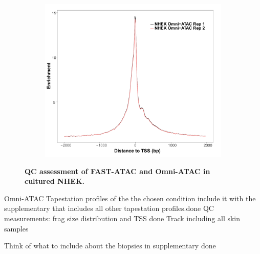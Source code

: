 \begin{figure}[htbp]
\begin{subfigure}{0.48\textwidth}
\end{subfigure}
\begin{subfigure}{0.5\textwidth}
\centering
\includegraphics[width=\textwidth]{./Results1/pdfs/ATAC_skin_TSS_enrichment_NHEK_omni_ATAC}
\caption{\textbf{}} %
\end{subfigure}%
\caption[QC assessment of FAST-ATAC and Omni-ATAC in cultured NHEK]{\textbf{QC assessment of FAST-ATAC and Omni-ATAC in cultured NHEK.\\
}}
\label{fig:PS02_skin_ATAC_QC_assessment}
\end{figure} 






Omni-ATAC
Tapestation profiles of the the chosen condition include it with the supplementary that includes all other tapestation profiles.done
QC measurements: frag size distribution and TSS done
Track including all skin samples

Think of what to include about the biopsies in supplementary done



